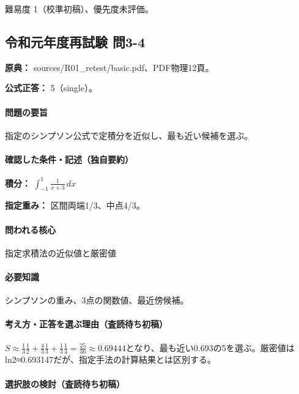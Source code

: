 \par 難易度 1（校準初稿）、優先度未評価。

\subsection{令和元年度再試験 問3-4}
\label{q:r01-ret-basic-3-4}

\noindent\textbf{原典：} sources/R01\_retest/basic.pdf、PDF物理12頁。

\textbf{公式正答：} 5（single）。

\paragraph{問題の要旨} 指定のシンプソン公式で定積分を近似し、最も近い候補を選ぶ。

\paragraph{確認した条件・記述（独自要約）}\mbox{}\par

\noindent\textbf{積分：} \(\int_{-1}^{1}\frac{1}{x+3}\,dx\)\par

\noindent\textbf{指定重み：} 区間両端1/3、中点4/3。\par

\paragraph{問われる核心} 指定求積法の近似値と厳密値

\paragraph{必要知識} シンプソンの重み、3点の関数値、最近傍候補。

\paragraph{考え方・正答を選ぶ理由（査読待ち初稿）} \(S\approx\frac13\frac12+\frac43\frac13+\frac13\frac14=\frac{25}{36}\approx0.69444\)となり、最も近い0.693の5を選ぶ。厳密値はln2≈0.693147だが、指定手法の計算結果とは区別する。

\paragraph{選択肢の検討（査読待ち初稿）}\mbox{}\par

